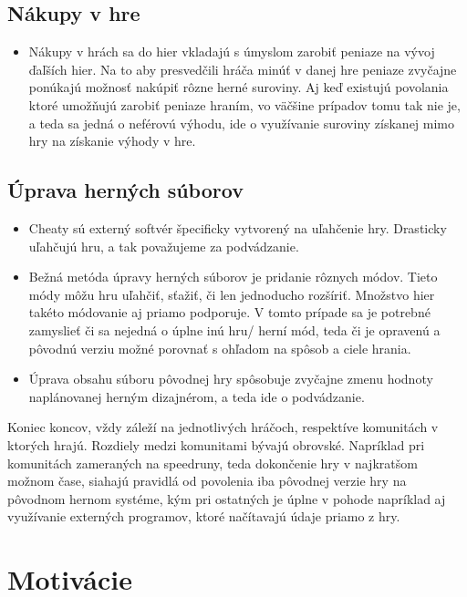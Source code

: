 \documentclass[10pt,twoside,slovak,a4paper]{article}
\begin{document}
\subsection{Nákupy v hre}
\begin{itemize}
\item Nákupy v hrách sa do hier vkladajú s úmyslom zarobiť peniaze na vývoj ďaľších hier. Na to aby presvedčili hráča minúť v danej hre peniaze zvyčajne ponúkajú možnosť nakúpiť rôzne herné suroviny. Aj keď existujú povolania ktoré umožňujú zarobiť peniaze hraním, vo väčšine prípadov tomu tak nie je, a teda sa jedná o neférovú výhodu, ide o využívanie suroviny získanej mimo hry na získanie výhody v hre.

\end{itemize}

\subsection{Úprava herných súborov}
\begin{itemize}
\item Cheaty sú externý softvér špecificky vytvorený na uľahčenie hry. Drasticky uľahčujú hru, a tak považujeme za podvádzanie.
\item Bežná metóda úpravy herných súborov je pridanie rôznych módov. Tieto módy môžu hru uľahčiť, sťažiť, či len jednoducho rozšíriť. Množstvo hier takéto módovanie aj priamo podporuje. V tomto prípade sa je potrebné zamyslieť či sa nejedná o úplne inú hru/ herní mód, teda či je opravenú a pôvodnú verziu možné porovnať s ohľadom na spôsob a ciele hrania.
\item Úprava obsahu súboru pôvodnej hry spôsobuje zvyčajne zmenu hodnoty naplánovanej herným dizajnérom, a teda ide o podvádzanie.
\end{itemize}

Koniec koncov, vždy záleží na jednotlivých hráčoch, respektíve komunitách v ktorých hrajú. Rozdiely medzi komunitami bývajú obrovské. Napríklad pri komunitách zameraných na speedruny, teda dokončenie hry v najkratšom možnom čase, siahajú pravidlá od povolenia iba pôvodnej verzie hry na pôvodnom hernom systéme, kým pri ostatných je úplne v pohode napríklad aj využívanie externých programov, ktoré načítavajú údaje priamo z hry.

\section{Motivácie}%
\end{document}
